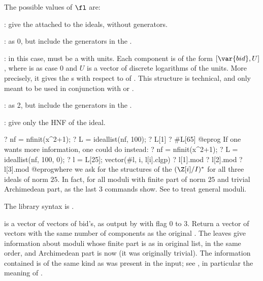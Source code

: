 The possible values of $\fl$ are:

: give the  attached to the ideals, without generators.

: as 0, but include the generators in the .

: in this case,  must be a  with units. Each
component is of the form $[\var{bid},U]$, where  is as case 0
and $U$ is a vector of discrete logarithms of the units. More precisely, it
gives the s with respect to  of .
This structure is technical, and only meant to be used in conjunction with
 or .

: as 2, but include the generators in the .

: give only the HNF of the ideal.

\bprog
? nf = nfinit(x^2+1);
? L = ideallist(nf, 100);
? L[1]
? #L[65]
@eprog
If one wants more information, one could do instead:
\bprog
? nf = nfinit(x^2+1);
? L = ideallist(nf, 100, 0);
? l = L[25]; vector(#l, i, l[i].clgp)
? l[1].mod
? l[2].mod
? l[3].mod
@eprog\noindent where we ask for the structures of the $(\Z[i]/I)^*$ for all
three ideals of norm $25$. In fact, for all moduli with finite part of norm
$25$ and trivial Archimedean part, as the last 3 commands show. See
 to treat general moduli.

The library syntax is .

\label{se:ideallistarch}
 is a vector of vectors of bid's, as output by  with
flag $0$ to $3$. Return a vector of vectors with the same number of
components as the original . The leaves give information about
moduli whose finite part is as in original list, in the same order, and
Archimedean part is now  (it was originally trivial). The
information contained is of the same kind as was present in the input; see
, in particular the meaning of \fl.


